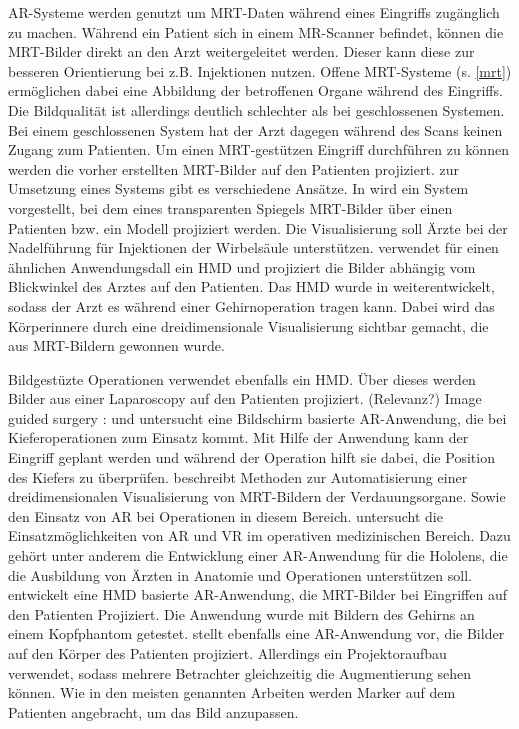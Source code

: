 AR-Systeme werden genutzt um MRT-Daten während eines Eingriffs zugänglich zu machen. Während ein Patient sich in einem MR-Scanner befindet, können die MRT-Bilder direkt an den Arzt weitergeleitet werden. Dieser kann diese zur besseren Orientierung bei z.B. Injektionen nutzen. Offene MRT-Systeme (s. \ref{mrt}) ermöglichen dabei eine Abbildung der betroffenen Organe während des Eingriffs. Die Bildqualität ist allerdings deutlich schlechter als bei geschlossenen Systemen. Bei einem geschlossenen System hat der Arzt dagegen während des Scans keinen Zugang zum Patienten. Um einen MRT-gestützen Eingriff durchführen zu können werden die vorher erstellten MRT-Bilder auf den Patienten projiziert. zur Umsetzung eines Systems gibt es verschiedene Ansätze.
In \citet{Fritz2012} wird ein System vorgestellt, bei dem eines transparenten Spiegels MRT-Bilder über einen Patienten bzw. ein Modell projiziert werden. Die Visualisierung soll Ärzte bei der Nadelführung für Injektionen der Wirbelsäule unterstützen. 
\cite{khamene03} verwendet für einen ähnlichen Anwendungsdall ein HMD und projiziert die Bilder abhängig vom Blickwinkel des Arztes auf den Patienten. Das HMD wurde in \cite{khamene01} weiterentwickelt, sodass der Arzt es während einer Gehirnoperation tragen kann. Dabei wird das Körperinnere durch eine dreidimensionale Visualisierung sichtbar gemacht, die aus MRT-Bildern gewonnen wurde. 

Bildgestüzte Operationen 
\cite{fuchs98} verwendet ebenfalls ein HMD. Über dieses werden Bilder aus einer Laparoscopy auf den Patienten projiziert. (Relevanz?)
Image guided surgery :\cite{grimson99} und  \cite{KerstenOertel2013TheSO}
\cite{MISCHKOWSKI2006478}
\cite{MISCHKOWSKI2006478} untersucht eine Bildschirm basierte AR-Anwendung, die bei Kieferoperationen zum Einsatz kommt. Mit Hilfe der Anwendung kann der Eingriff geplant werden und während der Operation hilft sie dabei, die Position des Kiefers zu überprüfen. 
\cite{Soler04} beschreibt Methoden zur Automatisierung einer dreidimensionalen Visualisierung von MRT-Bildern der Verdauungsorgane. Sowie den Einsatz von AR bei Operationen in diesem Bereich. 
\cite{GasquesRodrigues17} untersucht die Einsatzmöglichkeiten von AR und VR im operativen medizinischen Bereich. Dazu gehört unter anderem die Entwicklung einer AR-Anwendung für die Hololens, die die Ausbildung von Ärzten in Anatomie und Operationen unterstützen soll. 
\cite{Wendt03} entwickelt eine HMD basierte AR-Anwendung, die MRT-Bilder bei Eingriffen auf den Patienten Projiziert. Die Anwendung wurde mit Bildern des Gehirns an einem Kopfphantom getestet.
\cite{Watts17} stellt ebenfalls eine AR-Anwendung vor, die Bilder auf den Körper des Patienten projiziert. Allerdings ein Projektoraufbau verwendet, sodass mehrere Betrachter gleichzeitig die Augmentierung sehen können. Wie in den meisten genannten Arbeiten werden Marker auf dem Patienten angebracht, um das Bild anzupassen.
\cite{Tabrizi15}


